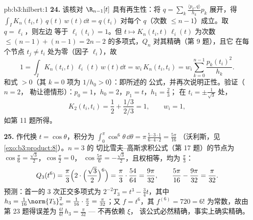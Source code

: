 \begin{solution}{pb:b3:hilbert:1}
\textbf{24.} 该核对 $\R_{n-1}[t]$ 具有再生性：将
$q = \sum_k\frac{\langle p_k, q\rangle}{h_k}p_k$ 展开，得
$\int_I K_n(t_i, t)\,q(t)\,w(t)\dd t = q(t_i)$ 对每个
$q$（次数 $\leq n - 1$）成立。取 $q = \ell_i$，则左边
等于 $\ell_i(t_i) = 1$。但 $t \mapsto K_n(t_i,
t)\,\ell_i(t)$ 为次数 $\leq (n - 1) + (n
- 1) = 2n - 2$ 的多项式，$Q_n$ 对其精确（第 9 题），且它
在每个节点 $t_j \neq t_i$ 处为零（因子 $\ell_i$），故
\[
1 = \int_I K_n(t_i, t)\,\ell_i(t)\,w(t)\dd t
= w_i\,K_n(t_i, t_i)
= w_i\sum_{k=0}^{n-1}\frac{p_k(t_i)^2}{h_k} .
\]
和式 $> 0$（其 $k = 0$ 项为 $1/h_0 > 0$）：即所述的
公式，并再次说明正性。验证（$n = 2$，
勒让德情形）：$p_0 = 1$，$h_0 = 2$，$p_1 = t$，$h_1 = \frac23$；
在 $t_i = \pm\frac1{\sqrt3}$ 处，
\[
K_2(t_i, t_i) = \frac12 + \frac{1/3}{2/3} = 1,
\qquad w_i = 1,
\]
如第 11 题所得。

\textbf{25.} 作代换 $t = \cos\theta$，积分为
$\int_0^\pi\cos^6\theta\,\dd\theta =
\pi\,\frac{5\cdot3\cdot1}{6\cdot4\cdot2} = \frac{5\pi}{16}$
（沃利斯，见\cref{exo:b3:product:8}）。$n = 3$ 的
切比雪夫--高斯求积公式（第 17 题）的节点为
$\cos\frac\pi6 = \frac{\sqrt3}2$，$\cos\frac\pi2 = 0$，
$\cos\frac{5\pi}6 = -\frac{\sqrt3}2$，且权相等，均为
$\frac\pi3$：
\[
Q_3(t^6) = \frac\pi3\Bigl(2\cdot\Bigl(\frac{\sqrt3}2
\Bigr)^{6}\Bigr) = \frac\pi3\cdot\frac{54}{64}
= \frac{9\pi}{32},
\qquad
\frac{5\pi}{16} - \frac{9\pi}{32} = \frac\pi{32} .
\]
预测：首一的 $3$ 次正交多项式为
$2^{-2}T_3 = t^3 - \frac34t$，其中 $h_3 =
\frac1{16}\norm{T_3}_w^2 = \frac1{16}\cdot\frac\pi2 =
\frac\pi{32}$；又 $f = t^6$，其 $f^{(6)} = 720 =
6!$ 为常数，故由第 23 题得误差为 $\frac{6!}{6!}\,h_3 =
\frac\pi{32}$ --- 不再依赖 $\xi$，
该公式必然精确，事实上确实精确。
\end{solution}
